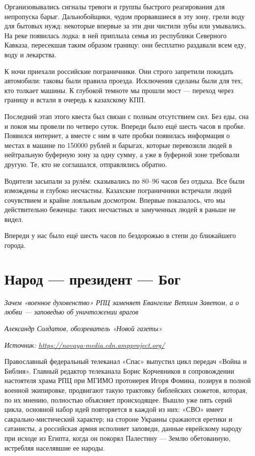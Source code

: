 Организовывались сигналы тревоги и группы быстрого реагирования для непропуска барыг. Дальнобойщики, чудом прорвавшиеся в эту зону, грели воду для бытовых нужд: некоторые впервые за эти дни чистили зубы или умывались. На реке появилась лодка: в ней приплыла семья из республики Северного Кавказа, пересекшая таким образом границу: они бесплатно раздавали всем еду, воду и лекарства.

К ночи приехали российские пограничники. Они строго запретили покидать автомобили: таковы были правила проезда. Исключения сделаны были для тех, кто толкает машины. К глубокой темноте мы прошли мост — переход через границу и встали в очередь к казахскому КПП.

Последний этап этого квеста был связан с полным отсутствием сил. Без еды, сна и покоя мы провели по четверо суток. Впереди было ещё шесть часов в пробке. Появился интернет, а вместе с ним в чате пробки появилась информация о местах в машине по 150000 рублей и барыгах, которые перевозили людей в нейтральную буферную зону за одну сумму, а уже в буферной зоне требовали другую. Те, кто не соглашался, отправлялись обратно.

Водители засыпали за рулём: сказывались по 80–96 часов без отдыха. Все были измождены и глубоко несчастны. Казахские пограничники встречали людей сочувствием и крайне лояльным досмотром. Впервые показалось, что мы действительно беженцы: таких несчастных и замученных людей я раньше не видел.

Впереди у нас было ещё шесть часов по бездорожью в степи до ближайшего города.


\newpage
\section{Народ — президент — Бог}


\textit{Зачем «военное духовенство» РПЦ заменяет Евангелие Ветхим Заветом, а  о любви — заповедью об уничтожении врагов }

\textit{Александр Солдатов, обозреватель «Новой газеты»}

\textit{Источник: \url{https://novaya-media.cdn.ampproject.org/}}

Православный федеральный телеканал «Спас» выпустил цикл передач «Война и Библия». Главный редактор телеканала Борис Корчевников в сопровождении настоятеля храма РПЦ при МГИМО протоиерея Игоря Фомина, позируя в полной военной экипировке, продвигают такую трактовку библейских сюжетов, которая, по их мнению, полностью объясняет происходящее. Вышло уже пять серий цикла, основной набор идей повторяется в каждой из них: «СВО» имеет сакрально-мистический характер; на стороне Украины сражаются еретики и сатанисты, а российская армия исполняет заповеди, данные еврейскому народу при исходе из Египта, когда он покорял Палестину — Землю обетованную, истребляя населявшие ее народы.

